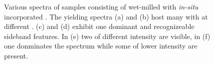 \begin{figure}[htp]
\begin{subfigure}[t]{ 0.49\linewidth}
			\caption{}
			\label{subfig::spectrum_5}
		\end{subfigure}
		\hfill
		\begin{subfigure}[t]{ 0.49\linewidth}
			\centering
			\caption{}
			\label{subfig::spectrum_6}
		\end{subfigure}
		\caption[Overview of diversity of \siv spectra.]{Various spectra of samples consisting of wet-milled \nds with \textit{in-situ} incorporated \sivs. The \nds yielding spectra (a) and (b) host many \sivs with \ZPL at different \cwls. (c) and (d) exhibit one dominant \ZPL and recognizeable sideband features. In (e) two \ZPLs of different intensity are visible, in (f) one \ZPL donminates the spectrum while some \ZPLs of lower intensity are present.}
		\label{fig::various_spectra}
	\end{figure}

